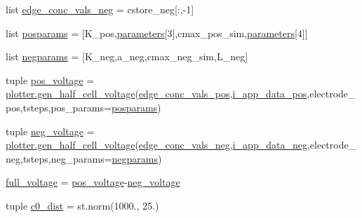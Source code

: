 \begin{DoxyCompactItemize}
\item 
list \hyperlink{namespace_uncertainty___propagation_acb92094c722cb9231eae663f2d7563ca}{edge\-\_\-conc\-\_\-vals\-\_\-neg} = cstore\-\_\-neg\mbox{[}\-:,-\/1\mbox{]}
\item 
list \hyperlink{namespace_uncertainty___propagation_a073ee030b3fea2b1f15194fee942060b}{posparams} = \mbox{[}K\-\_\-pos,\hyperlink{namespace_uncertainty___propagation_ad827090038061f4a04a789ab61df8c1d}{parameters}\mbox{[}3\mbox{]},cmax\-\_\-pos\-\_\-sim,\hyperlink{namespace_uncertainty___propagation_ad827090038061f4a04a789ab61df8c1d}{parameters}\mbox{[}4\mbox{]}\mbox{]}
\item 
list \hyperlink{namespace_uncertainty___propagation_ac8992e44d2fa887984bac92cc032cb5b}{negparams} = \mbox{[}K\-\_\-neg,a\-\_\-neg,cmax\-\_\-neg\-\_\-sim,L\-\_\-neg\mbox{]}
\item 
tuple \hyperlink{namespace_uncertainty___propagation_a7216b88d41d69db8e4728dc6e9951a87}{pos\-\_\-voltage} = \hyperlink{namespaceplotter_a716e2d183d061a11623adaf2dba72476}{plotter.\-gen\-\_\-half\-\_\-cell\-\_\-voltage}(\hyperlink{namespace_uncertainty___propagation_a2e425dd5abbd47ca217c22c04bb45c3e}{edge\-\_\-conc\-\_\-vals\-\_\-pos},\hyperlink{namespace_uncertainty___propagation_aa34db849c2abe725ec1b080fb93b0249}{i\-\_\-app\-\_\-data\-\_\-pos},electrode\-\_\-pos,tsteps,pos\-\_\-params=\hyperlink{namespace_uncertainty___propagation_a073ee030b3fea2b1f15194fee942060b}{posparams})
\item 
tuple \hyperlink{namespace_uncertainty___propagation_ac1c3b11f280ede1816fa37e269c8d420}{neg\-\_\-voltage} = \hyperlink{namespaceplotter_a716e2d183d061a11623adaf2dba72476}{plotter.\-gen\-\_\-half\-\_\-cell\-\_\-voltage}(\hyperlink{namespace_uncertainty___propagation_acb92094c722cb9231eae663f2d7563ca}{edge\-\_\-conc\-\_\-vals\-\_\-neg},\hyperlink{namespace_uncertainty___propagation_af0c0656dcb2e67c34296832b7bf7a499}{i\-\_\-app\-\_\-data\-\_\-neg},electrode\-\_\-neg,tsteps,neg\-\_\-params=\hyperlink{namespace_uncertainty___propagation_ac8992e44d2fa887984bac92cc032cb5b}{negparams})
\item 
\hyperlink{namespace_uncertainty___propagation_a103c299bf7e3807650c8012aa93a5953}{full\-\_\-voltage} = \hyperlink{namespace_uncertainty___propagation_a7216b88d41d69db8e4728dc6e9951a87}{pos\-\_\-voltage}-\/\hyperlink{namespace_uncertainty___propagation_ac1c3b11f280ede1816fa37e269c8d420}{neg\-\_\-voltage}
\item 
tuple \hyperlink{namespace_uncertainty___propagation_a18b5ccb1547d2ff074b16380e64cac39}{c0\-\_\-dist} = st.\-norm(1000., 25.)

\end{DoxyCompactItemize}
